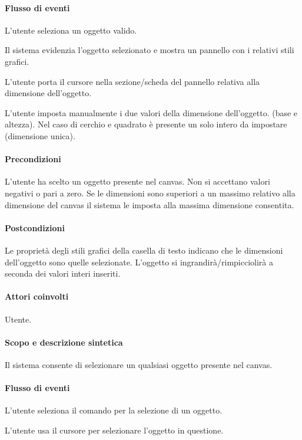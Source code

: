 \paragraph{Flusso di eventi}
\begin{elenconumerato}[\textbf{}]{\subsubsecindent}
\item  L'utente seleziona un oggetto valido.
\item  Il sistema evidenzia l'oggetto selezionato e mostra un pannello con i relativi stili grafici.
\item  L'utente porta il cursore nella sezione/scheda del pannello relativa alla dimensione dell'oggetto.
\item  L'utente imposta manualmente i due valori della dimensione dell'oggetto.
(base e altezza). Nel caso di cerchio e quadrato  \`e  presente un solo intero da impostare (dimensione unica).
\end{elenconumerato}
\paragraph{Precondizioni} L'utente ha scelto un oggetto presente nel canvas. Non si accettano valori negativi o pari a zero. Se le dimensioni sono superiori a un massimo relativo alla dimensione del canvas il sistema le imposta alla massima dimensione consentita.
\paragraph{Postcondizioni} Le propriet\` a degli stili grafici della casella di testo indicano che le dimensioni dell'oggetto  sono quelle selezionate. L'oggetto si ingrandir\`a/rimpicciolir\`a  a seconda dei valori interi inseriti.
                   
\paragraph{Attori coinvolti} Utente.
\paragraph{Scopo e descrizione sintetica} Il sistema consente di selezionare un qualsiasi oggetto presente nel canvas.
\paragraph{Flusso di eventi}
\begin{elenconumerato}[\textbf{}]{\subsubsecindent}
\item  L'utente seleziona il comando per la selezione di un oggetto.
\item  L'utente usa il cursore per selezionare l'oggetto in questione.
\end{elenconumerato}
